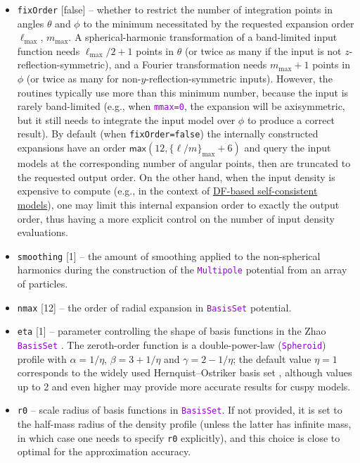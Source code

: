 \documentclass[12pt]{article}
\newcommand{\ttt}[1]{\textcolor{darkviolet}{\texttt{#1}}}
\newcommand{\ppp}[1]{\textcolor{darkolive} {\texttt{#1}}}
\begin{document}
\begin{itemize}
\item \ppp{fixOrder} [false] -- whether to restrict the number of integration points in angles $\theta$ and $\phi$ to the minimum necessitated by the requested expansion order $\ell_\mathrm{max}$, $m_\mathrm{max}$. A spherical-harmonic transformation of a band-limited input function needs $\ell_\mathrm{max}/2+1$ points in $\theta$ (or twice as many if the input is not $z$-reflection-symmetric), and a Fourier transformation needs $m_\mathrm{max}+1$ points in $\phi$ (or twice as many for non-$y$-reflection-symmetric inputs). However, the routines typically use more than this minimum number, because the input is rarely band-limited (e.g., when \ttt{mmax=0}, the expansion will be axisymmetric, but it still needs to integrate the input model over $\phi$ to produce a correct result). By default (when \ppp{fixOrder=false}) the internally constructed expansions have an order $\mathsf{max}(12, \{\ell/m\}_\mathrm{max}+6)$ and query the input models at the corresponding number of angular points, then are truncated to the requested output order. On the other hand, when the input density is expensive to compute (e.g., in the context of \hyperref[sec:SCM]{DF-based self-consistent models}), one may limit this internal expansion order to exactly the output order, thus having a more explicit control on the number of input density evaluations.
\item \ppp{smoothing} [1] -- the amount of smoothing applied to the non-spherical harmonics during the construction of the \ttt{Multipole} potential from an array of particles.
\item \ppp{nmax} [12] -- the order of radial expansion in \ttt{BasisSet} potential.
\item \ppp{eta} [1] -- parameter controlling the shape of basis functions in the Zhao \ttt{BasisSet} \cite{Zhao1996}. The zeroth-order function is a double-power-law (\ttt{Spheroid}) profile with $\alpha=1/\eta$, $\beta=3+1/\eta$ and $\gamma=2-1/\eta$; the default value $\eta=1$ corresponds to the widely used Hernquist--Ostriker basis set \cite{HernquistOstriker1992}, although values up to 2 and even higher may provide more accurate results for cuspy models.
\item \ppp{r0} -- scale radius of basis functions in \ttt{BasisSet}. If not provided, it is set to the half-mass radius of the density profile (unless the latter has infinite mass, in which case one needs to specify \ppp{r0} explicitly), and this choice is close to optimal for the approximation accuracy.
\end{itemize}
\end{document}
